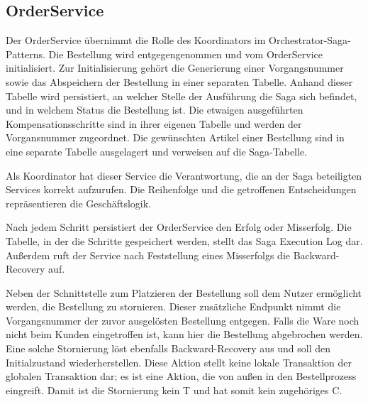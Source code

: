 \subsection{OrderService}
Der OrderService übernimmt die Rolle des Koordinators im Orchestrator-Saga-Patterns. Die Bestellung wird entgegengenommen und vom OrderService initialisiert. Zur Initialisierung gehört die Generierung einer Vorgangsnummer sowie das Abspeichern der Bestellung in einer separaten Tabelle. Anhand dieser Tabelle wird persistiert, an welcher Stelle der Ausführung die Saga sich befindet, und in welchem Status die Bestellung ist. Die etwaigen ausgeführten Kompensationsschritte sind in ihrer eigenen Tabelle und werden der Vorgansnummer zugeordnet. Die gewünschten Artikel einer Bestellung sind in eine separate Tabelle ausgelagert und verweisen auf die Saga-Tabelle. 

Als Koordinator hat dieser Service die Verantwortung, die an der Saga beteiligten Services korrekt aufzurufen. Die Reihenfolge und die getroffenen Entscheidungen repräsentieren die Geschäftslogik. 

Nach jedem Schritt persistiert der OrderService den Erfolg oder Misserfolg. Die Tabelle, in der die Schritte gespeichert werden, stellt das Saga Execution Log dar. Außerdem ruft der Service nach Feststellung eines Misserfolgs die Backward-Recovery auf. 

Neben der Schnittstelle zum Platzieren der Bestellung soll dem Nutzer ermöglicht werden, die Bestellung zu stornieren. Dieser zusätzliche Endpunkt nimmt die Vorgangsnummer der zuvor ausgelösten Bestellung entgegen. Falls die Ware noch nicht beim Kunden eingetroffen ist, kann hier die Bestellung abgebrochen werden. Eine solche Stornierung löst ebenfalls Backward-Recovery aus und soll den Initialzustand wiederherstellen. Diese Aktion stellt keine lokale Transaktion der globalen Transaktion dar; es ist eine Aktion, die von außen in den Bestellprozess eingreift. Damit ist die Stornierung kein T und hat somit kein zugehöriges C.